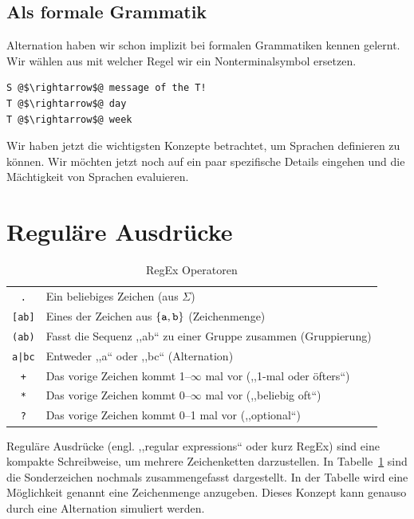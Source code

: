 \subsection{Als formale Grammatik}
%
Alternation haben wir schon implizit bei formalen Grammatiken kennen gelernt. Wir wählen aus mit welcher Regel wir ein Nonterminalsymbol ersetzen.
%
\begin{lstlisting}
S @$\rightarrow$@ message of the T!
T @$\rightarrow$@ day
T @$\rightarrow$@ week
\end{lstlisting}

Wir haben jetzt die wichtigsten Konzepte betrachtet, um Sprachen definieren zu können. Wir möchten jetzt noch auf ein paar spezifische Details eingehen und die Mächtigkeit von Sprachen evaluieren.

\section{Reguläre Ausdrücke}
%
\begin{table}[ht]
 \begin{center}
  \begin{tabular}{cl}
   \hline
    \texttt{.}     & Ein beliebiges Zeichen (aus $\Sigma$) \\
    \texttt{[ab]}  & Eines der Zeichen aus $\left\{\texttt{a}, \texttt{b}\right\}$ (Zeichenmenge) \\
    \texttt{(ab)}  & Fasst die Sequenz ,,ab`` zu einer Gruppe zusammen (Gruppierung) \\
    \texttt{a|bc}  & Entweder ,,a`` oder ,,bc`` (Alternation) \\
    \texttt{+}     & Das vorige Zeichen kommt 1--$\infty$ mal vor (,,1-mal oder öfters``) \\
    \texttt{*}     & Das vorige Zeichen kommt 0--$\infty$ mal vor (,,beliebig oft``) \\
    \texttt{?}     & Das vorige Zeichen kommt 0--1 mal vor (,,optional``) \\
   \hline
  \end{tabular}
  \caption{RegEx Operatoren}
  \label{tab:regex_op}
 \end{center}
\end{table}
%
Reguläre Ausdrücke (engl. ,,regular expressions`` oder kurz RegEx) sind eine kompakte Schreibweise, um mehrere Zeichenketten darzustellen. In Tabelle~\ref{tab:regex_op} sind die Sonderzeichen nochmals zusammengefasst dargestellt. In der Tabelle wird eine Möglichkeit genannt eine Zeichenmenge anzugeben. Dieses Konzept kann genauso durch eine Alternation simuliert werden.

